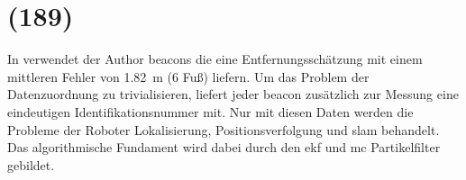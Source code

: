 \begin{comment}
------------------------------------------------------------------------------------------
- Section 2
	- Statische Lokalisierung
		- Vorherige Sensorinformationen und Positionsschätzung werden nicht genutzt.
		- Annahme: Position der Beacons ist bekannt und fix.
	- Markovian probability grids
	- Mit fehlerfreien Messungen ist die Positionsbestimmung trivial
	- Entfernungsmessung mit einem erwarteten Fehler von 6 feet, also 1,82 meter. (1Fuß==30cm)
	- 1. Characterizing Range Measurements
		- Erstellen einer Verteilungsfunktion für die Entfernungsmessung
		- experimentel bestimmt
		- Diskrete Messungen in einem Set {0,6,12,...,50}
	- 2. Creating Probability Grids
		- Für jede Zelle des Grid wird die Wahrscheinlichkeit mittels der PDF berechnet.
	- 3. Combine Probability Grids
		- Multiply in a pointwise manner
		- scale the result so that the sum over the squares is one.
		- Aus den kombinierten Ergebnisgrid kann die schätzte Position mittels der gewichteten Durchschnitt der Gridzellen berechnet werden.
		- Covariance Matrix lässt sich auch bestimmen
	- Durchschnittlich geschätzer Fehler lag ab 1,62 feet bei einem geschätzen Entfernungsmess Fehler von 5.82 bis 7.18 feet.
- Section 3
	- Beacon positionen sind bekannt
	- Vorherige Positionsschätzung und Odometry daten werden verwendet.
	- Positionsverfolgung mittels Kalman und Monte Carlo
	- Kalman
		- Initiale Positionsschätzung wie in Section 2, jedoch mit drei Beacons.
		- Approximieren eines ringförmigen Gauß-Verteilung um die geschätzte Position.
		- Füttern eines entsprechenden EKF mit den Parametern
	- Monte Carlo
		- Verwendet die pdf aus Section 2 um die Partikels zu gewichten.
	- Durchschnittliche Geschätzter Fehler
		- EKT: 0,73 feet
		- MC: 0,93 feet
- Section 4
	- Lokalisieren in einer Umgebung mit unsicheren beacon positionen
		- Approximately known, good but not perfect
		- crude measurement or estimate location on blueprint
	- SLAM mit EKF
		- State ist die Robot-- und Beacon--Position
		- Error: init 5.13 feet, end 0.77 feet
\end{comment}
\section{(189)}

In \cite{kantor2002preliminary} verwendet der Author \Glspl{beacon} die eine Entfernungsschätzung mit einem mittleren Fehler von \SI{1.82}{\metre} (6 Fuß) liefern. Um das Problem der Datenzuordnung zu trivialisieren, liefert jeder \Gls{beacon} zusätzlich zur Messung eine eindeutigen Identifikationsnummer mit. Nur mit diesen Daten werden die Probleme der Roboter Lokalisierung, Positionsverfolgung und \Gls{slam} behandelt. Das algorithmische Fundament wird dabei durch den \Gls{ekf} und \Gls{mc} Partikelfilter gebildet.

